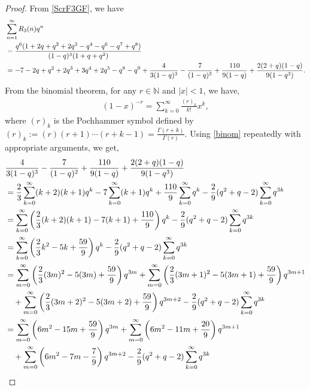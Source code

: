 \documentclass[12pt,reqno]{amsart}
\numberwithin{equation}{section}
\theoremstyle{plain}
\begin{document}
	\begin{proof}
		From \eqref{ScrF3GF}, we have
		\begin{align}
			&\sum_{n=1}^{\infty} R_3(n) q^n \notag \\
			&= \frac{q^6(1+2q+q^2+2q^3-q^4-q^6-q^7+q^8)}{(1-q)^3(1+q+q^2)} \notag \\
			&= -7 -2q +q^2 +2q^3 +3q^4 +2q^5 -q^8 -q^9 +\frac{4}{3(1-q)^3}- \frac{7}{(1-q)^2} + \frac{110}{9 (1-q)} +  \frac{2(2+q)(1-q)}{9(1-q^3)}. \label{3inter}
		\end{align}		
		From the binomial theorem, for any $r \in \mathbb{N}$ and $|x|<1$, we have,
		\begin{align}
			(1-x)^{-r} = \sum_{k=0}^{\infty} \frac{(r)_k}{k!}x^k, \label{binom}
		\end{align}
		where $(r)_k$ is the Pochhammer symbol defined by $(r)_k:=(r)(r+1)\cdots (r+k-1)= \frac{\Gamma(r+k)}{\Gamma(r)}$.
		Using \eqref{binom} repeatedly with appropriate arguments, we get,
		\begin{align}
			&\frac{4}{3(1-q)^3}- \frac{7}{(1-q)^2} + \frac{110}{9 (1-q)} +  \frac{2(2+q)(1-q)}{9(1-q^3)} \notag \\
			&=\frac{2}{3} \sum_{k=0}^{\infty} (k+2)(k+1) q^k -  7\sum_{k=0}^{\infty}(k+1)q^k + \frac{110}{9} \sum_{k=0}^{\infty} q^k- \frac{2}{9} (q^2+q-2)  \sum_{k=0}^{\infty} q^{3k} \notag \\
			&= \sum_{k=0}^{\infty} \left( \frac{2}{3} (k+2)(k+1) -7(k+1) + \frac{110}{9} \right) q^k - \frac{2}{9} (q^2+q-2)  \sum_{k=0}^{\infty} q^{3k} \notag \\
			&= \sum_{k=0}^{\infty} \left( \frac{2}{3} k^2 -5k + \frac{59}{9} \right) q^k - \frac{2}{9} (q^2+q-2)  \sum_{k=0}^{\infty} q^{3k}\notag \\
			&= \sum_{m=0}^{\infty} \left( \frac{2}{3} (3m)^2 -5(3m) + \frac{59}{9} \right) q^{3m} +\sum_{m=0}^{\infty} \left( \frac{2}{3} (3m+1)^2 -5(3m+1) + \frac{59}{9} \right) q^{3m+1} \notag\\
			&\quad + \sum_{m=0}^{\infty} \left( \frac{2}{3} (3m+2)^2 -5(3m+2) + \frac{59}{9} \right) q^{3m+2} - \frac{2}{9} (q^2+q-2)  \sum_{k=0}^{\infty} q^{3k} \notag\\
			&= \sum_{m=0}^{\infty} \left( 6m^2 -15m + \frac{59}{9} \right) q^{3m} +\sum_{m=0}^{\infty} \left( 6m^2 -11m + \frac{20}{9} \right) q^{3m+1} \notag\\
			&\quad + \sum_{m=0}^{\infty} \left( 6m^2 -7m - \frac{7}{9} \right) q^{3m+2} - \frac{2}{9} (q^2+q-2)  \sum_{k=0}^{\infty} q^{3k}\notag \\

\end{align}
\end{proof}
\end{document}
